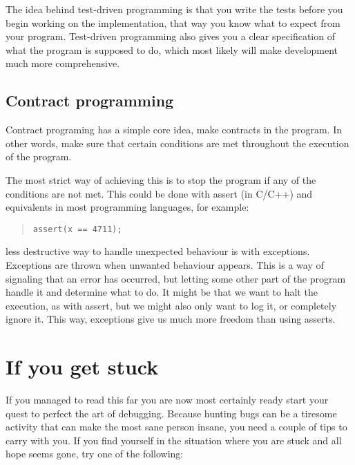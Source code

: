 \documentclass[11pt,a4paper,twoside]{article}
\begin{document}
The idea behind test-driven programming is that you write the tests before you
begin working on the implementation, that way you know what to expect from your
program. Test-driven programming also gives you a clear specification of
what the program is supposed to do, which most likely will make development
much more comprehensive.


\subsection{Contract programming}

Contract programing has a simple core idea, make contracts in the program. In
other words, make sure that certain conditions are met throughout the execution
of the program.

The most strict way of achieving this is to stop the program if any of the
conditions are not met. This could be done with assert (in C/C++) and
equivalents in most programming languages, for example:

\begin{quote}
\begin{verbatim}
assert(x == 4711);
\end{verbatim}
\end{quote}

 less destructive way to handle unexpected behaviour is with exceptions.
Exceptions are thrown when unwanted behaviour appears. This is a way of
signaling that an error has occurred, but letting some other part of the
program handle it and determine what to do. It might be that we want to halt
the execution, as with assert, but we might also only want to log it, or
completely ignore it. This way, exceptions give us much more freedom than using
asserts.


\section{If you get stuck}

If you managed to read this far you are now most certainly ready start your
quest to perfect the art of debugging. Because hunting bugs can be a tiresome
activity that can make the most sane person insane, you need a couple of tips
to carry with you. If you find yourself in the situation where you are stuck
and all hope seems gone, try one of the following: 
\end{document}
